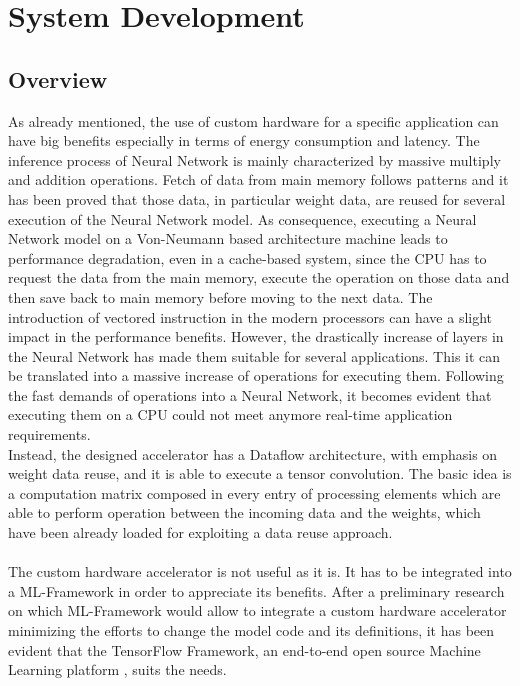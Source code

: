 \chapter{System Development}

\section{Overview}
As already mentioned, the use of custom hardware for a specific application can have big benefits especially in terms of energy consumption and latency.
The inference process of Neural Network is mainly characterized by massive multiply and addition operations. Fetch of data from main memory follows patterns and it has been proved that those data, in particular weight data, are reused for several execution of the Neural Network model.
As consequence, executing a Neural Network model on a Von-Neumann based architecture machine leads to performance degradation, even in a cache-based system, since the CPU has to request the data from the main memory, execute the operation on those data and then save back to main memory before moving to the next data. The introduction of vectored instruction in the modern processors can have a slight impact in the performance benefits. However, the drastically increase of layers in the Neural Network has made them suitable for several applications. This it can be translated into a massive increase of operations for executing them. Following the fast demands of operations into a Neural Network, it becomes evident that executing them on a CPU could not meet anymore real-time application requirements.\\
Instead, the designed accelerator has a Dataflow architecture, with emphasis on weight data reuse, and it is able to execute a tensor convolution. The basic idea is a computation matrix composed in every entry of processing elements which are able to perform operation between the incoming data and the weights, which have been already loaded for exploiting a data reuse approach.\\\\
The custom hardware accelerator is not useful as it is. It has to be integrated into a ML-Framework in order to appreciate its benefits. After a preliminary research on which ML-Framework would allow to integrate a custom hardware accelerator minimizing the efforts to change the model code and its definitions, it has been evident that the TensorFlow Framework, an end-to-end open source Machine Learning platform \cite{WEBSITE:4}, suits the needs.\\

